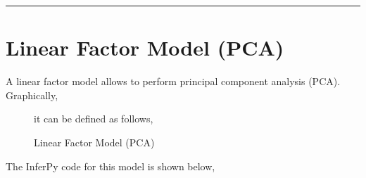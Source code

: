 \documentclass[letterpaper,10pt,english]{sphinxmanual}
\begin{document}
\begin{sphinxVerbatim}[commandchars=\\\{\}]
     
            
          \PYG{p}{[}\PYG{p}{]} \PYG{p}{[}\PYG{p}{]} 

   


\end{sphinxVerbatim}


\bigskip\hrule\bigskip



\section{Linear Factor Model (PCA)}
\label{\detokenize{notes/probzoo:linear-factor-model-pca}}\begin{description}
\item[{A linear factor model allows to perform principal component analysis (PCA). Graphically,}] \leavevmode
it can be defined as follows,

\end{description}

\begin{figure}[htbp]
\centering
\capstart

\noindent{}
\caption{Linear Factor Model (PCA)}\label{\detokenize{notes/probzoo:id5}}\end{figure}

The InferPy code for this model is shown below,
\end{document}
